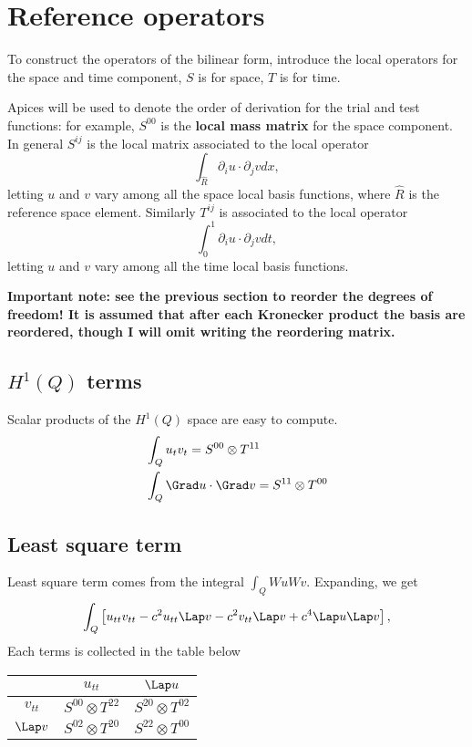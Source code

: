\documentclass[]{report}
\begin{document}
    \section*{Reference operators}
    To construct the operators of the bilinear form, introduce the local operators for the space and time component, $S$ is for space, $T$ is for time. 

    
    Apices will be used to denote the order of derivation for the trial and test functions: for example, $S^{00}$ is the \textbf{local mass matrix} for the space component. In general $S^{ij}$ is the local matrix associated to the local operator
    \begin{equation*}
        \int_{\hat{R}} \partial_i u \cdot \partial_j v dx,
    \end{equation*}
    letting $u$ and $v$ vary among all the space local basis functions, where $\hat{R}$ is the reference space element.
    Similarly $T^{ij}$ is associated to the local operator 
    \begin{equation*}
        \int_0^1 \partial_i u \cdot \partial_j v dt,
    \end{equation*}
    letting $u$ and $v$ vary among all the time local basis functions.
    
    {\bfseries \color{red} Important note: see the previous section to reorder the degrees of freedom! It is assumed that after each Kronecker product the basis are reordered, though I will omit writing the reordering matrix. }
    
    \subsection*{$H^1(Q)$ terms}
    Scalar products of the $H^1(Q)$ space are easy to compute.
    \begin{align*}
        &\int_Q u_tv_t = S^{00} \otimes T^{11}\\
        &\int_Q \Grad u \cdot \Grad v = S^{11} \otimes T^{00}
    \end{align*}

    \subsection*{Least square term}
    Least square term comes from the integral $\int_Q Wu Wv$. Expanding, we get
    \begin{equation*}
        \int_Q \left[ u_{tt} v_{tt} - c^2 u_{tt} \Lap v - c^2 v_{tt} \Lap v +c^4 \Lap u \Lap v \right],
    \end{equation*}
    Each terms is collected in the table below
    \begin{center}
        \begin{tabular}[]{|c||c|c|}
            \hline
                        & $u_{tt}$    & $\Lap u$ \\
            \hline \hline
            $v_{tt}$    & $S^{00} \otimes T^{22}$ & $S^{20} \otimes T^{02}$ \\
            \hline
            $\Lap v$    & $S^{02} \otimes T^{20}$ & $S^{22} \otimes T^{00}$ \\
            \hline
        \end{tabular}
    \end{center}
\end{document}
